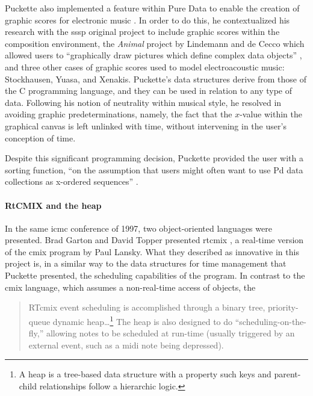 	Puckette also implemented a feature within Pure Data to enable the creation of graphic scores for electronic music \parencite{DBLP:conf/icmc/Puckette02}. In order to do this, he contextualized his research with the \gls{sssp} original project to include graphic scores within the composition environment, the \textit{Animal} project by Lindemann and de Cecco which allowed users to ``graphically draw pictures which define complex data objects'' \parencite{DBLP:conf/icmc/Lindemann90a}, and three other cases of graphic scores used to model electroacoustic music: Stockhausen, Yuasa, and Xenakis. Puckette's data structures derive from those of the C programming language, and they can be used in relation to any type of data. 
	Following his notion of neutrality within musical style, he resolved in avoiding graphic predeterminations, namely, the fact that the $x$-value within the graphical canvas is left unlinked with time, without intervening in the user's conception of time. 

	Despite this significant programming decision, Puckette provided the user with a sorting function, ``on the assumption that users might often want to use Pd data collections as x-ordered sequences'' \parencite{DBLP:conf/icmc/Puckette02}.

	\paragraph{RtCMIX and the heap}
	\label{computer:rtcmix}



	In the same \gls{icmc} conference of 1997, two object-oriented languages were presented. Brad Garton and David Topper presented \gls{rtcmix} \parencite{DBLP:conf/icmc/GartonT97}, a real-time version of the \gls{cmix} program by Paul Lansky. What they described as innovative in this project is, in a similar way to the data structures for time management that Puckette presented, the scheduling capabilities of the program. In contrast to the \gls{cmix} language, which assumes a non-real-time access of objects, the

	\begin{quote}
		RTcmix event scheduling is accomplished through a binary tree, priority-queue dynamic heap\dots\footnote{A heap is a tree-based data structure with a property such keys and parent-child relationships follow a hierarchic logic.} The heap is also designed to do ``scheduling-on-the-fly,'' allowing notes to be scheduled at run-time (usually triggered by an external event, such as a \gls{midi} note being depressed). \parencite{DBLP:conf/icmc/GartonT97}
	\end{quote}

